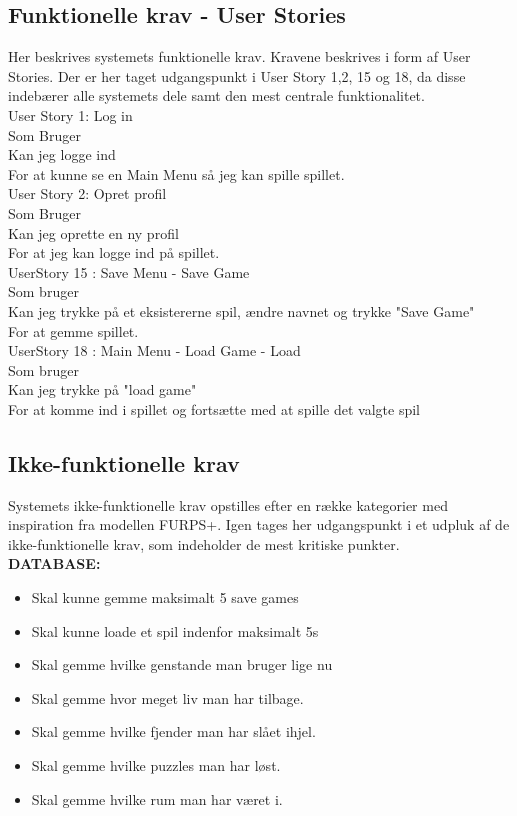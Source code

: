 \subsection{Funktionelle krav - User Stories}
Her beskrives systemets funktionelle krav. Kravene beskrives i form af User Stories. Der er her taget udgangspunkt i User Story 1,2, 15 og 18, da disse indebærer alle systemets dele samt den mest centrale funktionalitet.\\  
 
User Story 1: Log in \\
  Som Bruger \\
  Kan jeg logge ind \\
  For at kunne se en Main Menu så jeg kan spille spillet. \\
  
User Story 2: Opret profil \\
  Som Bruger \\
  Kan jeg oprette en ny profil \\
  For at jeg kan logge ind på spillet. \\
  
UserStory 15 : Save Menu - Save Game\\
  Som bruger \\
  Kan jeg trykke på et eksistererne spil, ændre navnet og trykke "Save Game" \\
  For at gemme spillet.\\

UserStory 18 : Main Menu - Load Game - Load\\
  Som bruger \\
  Kan jeg trykke på "load game" \\
  For at komme ind i spillet og fortsætte med at spille det valgte spil\\


\subsection{Ikke-funktionelle krav}
Systemets ikke-funktionelle krav opstilles efter en række kategorier med inspiration fra modellen FURPS+. Igen tages her udgangspunkt i et udpluk af de ikke-funktionelle krav, som indeholder de mest kritiske punkter.\\

\textbf{DATABASE:}

\begin{itemize}
  \item Skal kunne gemme maksimalt 5 save games
  \item Skal kunne loade et spil indenfor maksimalt 5s
  \item Skal gemme hvilke genstande man bruger lige nu
  \item Skal gemme hvor meget liv man har tilbage.
  \item Skal gemme hvilke fjender man har slået ihjel.
  \item Skal gemme hvilke puzzles man har løst.
  \item Skal gemme hvilke rum man har været i.
\end{itemize}

